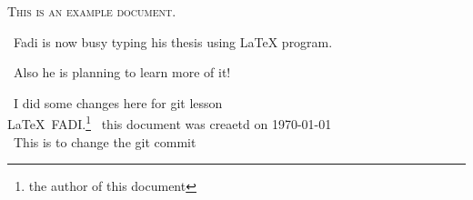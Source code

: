 \documentclass[12pt,a4,parskip=full]{scrreprt} %
\begin{document}
\textsc{This is an example document.}\par 
\ Fadi is now busy typing his thesis using LaTeX program.\par
\ Also he is planning to learn more of it!\par
\ I did some changes here for git lesson\\

\LaTeX\ {FADI.}\footnote{the author of this document} 
\ this document was creaetd on \today\\
\ This is to change the git commit
\end{document}
